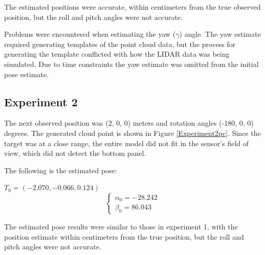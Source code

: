 \documentclass[conference]{IEEEtran}
\begin{document}
		The estimated positions were accurate, within centimeters from the true observed position, but the roll and pitch angles were not accurate.
	
		Problems were encountered when estimating the yaw ($\gamma$) angle. The yaw estimate required generating templates of the point cloud data, but the process for generating the template conflicted with how the LIDAR data was being simulated. Due to time constraints the yaw estimate was omitted from the initial pose estimate.

	\subsection{Experiment 2}
	The next observed position was (2, 0, 0) meters and rotation angles (-180, 0, 0) degrees. The generated cloud point is shown in Figure \ref{Experiment2pc}. Since the target was at a close range, the entire model did not fit in the sensor's field of view, which did not detect the bottom panel.
	
	The following is the estimated pose:
	\begin{center}
		$T_0 = (-2.070, -0.066, 0.124)$
		\[
		\begin{cases}
			\alpha_0 = -28.242 \\
			\beta_0 = 86.043
		\end{cases}
		\]
	\end{center}
	
	The estimated pose results were similar to those in experiment 1, with the position estimate within centimeters from the true position, but the roll and pitch angles were not accurate.
\end{document}
